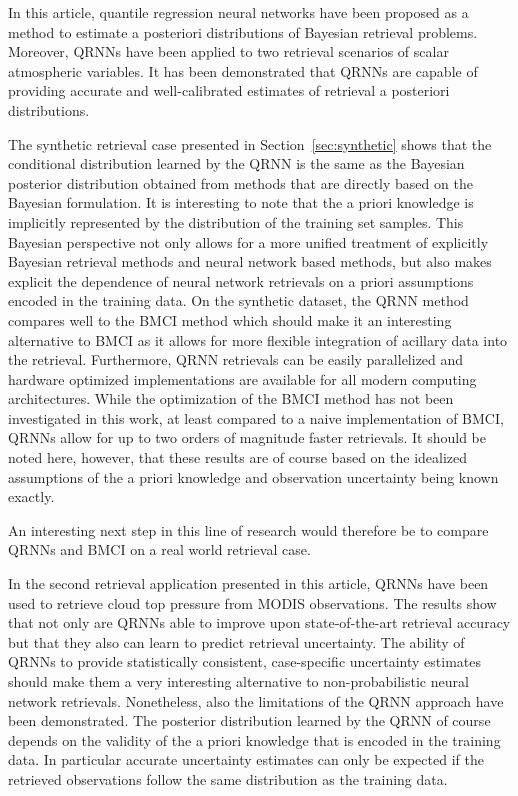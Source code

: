 \documentclass[journal abbreviation, manuscript]{copernicus}
\begin{document}
\conclusions  %

In this article, quantile regression neural networks have been proposed as a method
to estimate a posteriori distributions of Bayesian retrieval problems. Moreover,
QRNNs have been applied to two retrieval scenarios of scalar atmospheric variables.
It has been demonstrated that QRNNs are capable of providing accurate and
well-calibrated estimates of retrieval a posteriori distributions.

The synthetic retrieval case presented in Section~\ref{sec:synthetic} shows that
the conditional distribution learned by the QRNN is the same as the Bayesian
posterior distribution obtained from methods that are directly based on the
Bayesian formulation. It is interesting to note that the a priori knowledge is
implicitly represented by the distribution of the training set samples. This
Bayesian perspective not only allows for a more unified treatment of explicitly
Bayesian retrieval methods and neural network based methods, but also makes
explicit the dependence of neural network retrievals on a priori assumptions
encoded in the training data. On the synthetic dataset, the QRNN method compares
well to the BMCI method which should make it an interesting alternative to BMCI
as it allows for more flexible integration of acillary data into the retrieval.
Furthermore, QRNN retrievals can be easily parallelized and hardware optimized
implementations are available for all modern computing architectures. While the
optimization of the BMCI method has not been investigated in this work, at least
compared to a naive implementation of BMCI, QRNNs allow for up to two orders of
magnitude faster retrievals. It should be noted here, however, that these
results are of course based on the idealized assumptions of the a priori
knowledge and observation uncertainty being known exactly.

An interesting next step in this line of research would therefore be to compare
QRNNs and BMCI on a real world retrieval case.

In the second retrieval application presented in this article, QRNNs have been
used to retrieve cloud top pressure from MODIS observations. The results show
that not only are QRNNs able to improve upon state-of-the-art retrieval
accuracy but that they also can learn to predict retrieval uncertainty. The
ability of QRNNs to provide statistically consistent, case-specific uncertainty
estimates should make them a very interesting alternative to non-probabilistic
neural network retrievals. Nonetheless, also the limitations of the QRNN approach
have been demonstrated. The posterior distribution learned by the QRNN of course
depends on the validity of the a priori knowledge that is encoded in the
training data. In particular accurate uncertainty estimates can only be expected
if the retrieved observations follow the same distribution as the training data.
\end{document}
